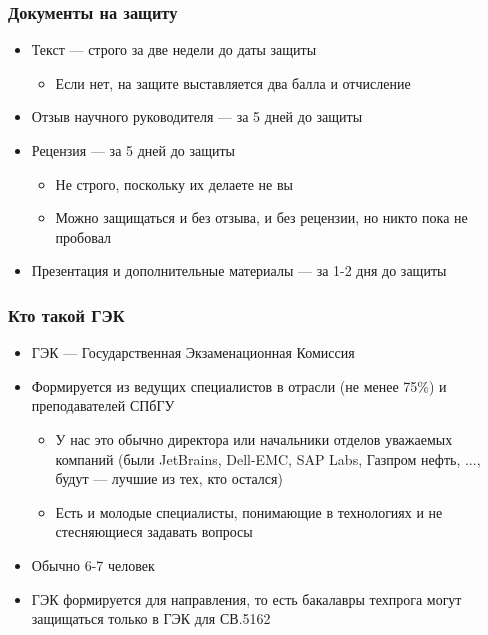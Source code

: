 \documentclass{../../slides-style}
\begin{document}
    \begin{frame}
        \frametitle{Документы на защиту}
        \begin{itemize}
            \item Текст --- строго за две недели до даты защиты
            \begin{itemize}
                \item Если нет, на защите выставляется два балла и отчисление
            \end{itemize}
            \item Отзыв научного руководителя --- за 5 дней до защиты
            \item Рецензия --- за 5 дней до защиты
            \begin{itemize}
                \item Не строго, поскольку их делаете не вы
                \item Можно защищаться и без отзыва, и без рецензии, но никто пока не пробовал
            \end{itemize}
            \item Презентация и дополнительные материалы --- за 1-2 дня до защиты
        \end{itemize}
    \end{frame}

    \begin{frame}
        \frametitle{Кто такой ГЭК}
        \begin{itemize}
            \item ГЭК --- Государственная Экзаменационная Комиссия
            \item Формируется из ведущих специалистов в отрасли (не менее 75\%) и преподавателей СПбГУ
            \begin{itemize}
                \item У нас это обычно директора или начальники отделов уважаемых компаний (были JetBrains, Dell-EMC, SAP Labs, Газпром нефть, ..., будут --- лучшие из тех, кто остался)
                \item Есть и молодые специалисты, понимающие в технологиях и не стесняющиеся задавать вопросы
            \end{itemize}
            \item Обычно 6-7 человек
            \item ГЭК формируется для направления, то есть бакалавры техпрога могут защищаться только в ГЭК для СВ.5162
        \end{itemize}
    \end{frame}
\end{document}

